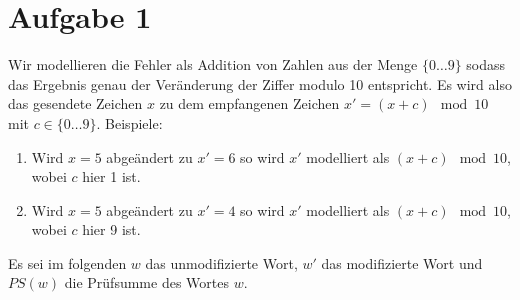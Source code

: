 

\section*{Aufgabe 1}
Wir modellieren die Fehler als Addition von Zahlen aus der Menge $\lbrace 0 \ldots 9\rbrace$ sodass das Ergebnis genau der Veränderung der Ziffer modulo 10 entspricht.
Es wird also das gesendete Zeichen $x$ zu dem empfangenen Zeichen $x' = (x + c) \mod 10$ mit $c\in\lbrace 0 \ldots 9\rbrace$.
Beispiele:
\begin{enumerate}
	\item Wird $x = 5$ abgeändert zu $x' = 6$ so wird $x'$  modelliert als $(x + c) \mod 10$, wobei $c$ hier 1 ist.
	\item Wird $x = 5$ abgeändert zu $x' = 4$ so wird $x'$  modelliert als $(x + c) \mod 10$, wobei $c$ hier 9 ist.
\end{enumerate}

Es sei im folgenden $w$ das unmodifizierte Wort, $w'$ das modifizierte Wort und $PS(w)$ die Prüfsumme des Wortes $w$.

